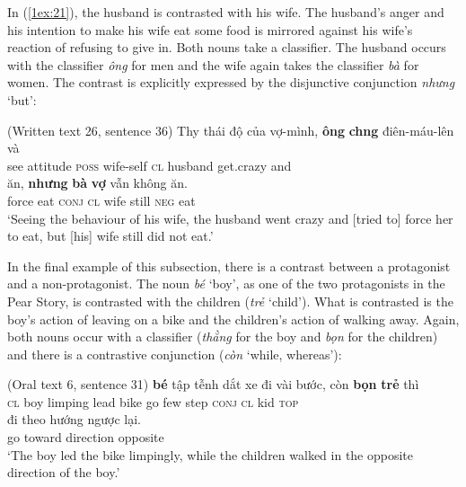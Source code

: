 \documentclass[output=paper]{langsci/langscibook}
\begin{document}
In (\ref{1ex:21}), the husband is contrasted with his wife. The husband's anger and his intention to make his wife eat some food is mirrored against his wife's reaction of refusing to give in. Both nouns take a classifier. The husband occurs with the classifier {\emph{ông}} for men and the wife again takes the classifier {\emph{bà}} for women. The contrast is explicitly expressed by the disjunctive conjunction {\emph{nhưng}} `but':

\begin{exe}
\ex\label{1ex:21}
(Written text 26, sentence 36)
\exi{}
\gll Th{\daa}y  {thái độ}   của       vợ-mình,  {\textbf{ông}} {\textbf{ch{\daob}ng}}     điên-máu-lên  và \\
see     attitude  {\textsc{poss}}   wife-self   {\textsc{cl}}  husband  get.crazy        and \\
\glt 
\exi{}
   ăn,  {\textbf{nhưng}}  {\textbf{bà}}   {\textbf{vợ}}     vẫn  không  ăn.  \\
force    eat   {\textsc{conj}}   {\textsc{cl}}  wife  still  {\textsc{neg}}   eat \\
\glt `Seeing the behaviour of his wife, the husband went crazy and [tried to] force her to eat, but [his] wife still did not eat.'
\end{exe}

In the final example of this subsection, there is a contrast between a protagonist and a non-protagonist. The noun {\emph{bé}} `boy', as one of the two protagonists in the Pear Story, is contrasted with the children ({\emph{trẻ}} `child'). What is contrasted is the boy's action of leaving on a bike and the children's action of walking away. Again, both nouns occur with a classifier ({\emph{thằng}} for the boy and {\emph{bọn}} for the children) and there is a contrastive conjunction ({\emph{còn}} `while, whereas'):

\begin{samepage}
\begin{exe}
\ex\label{1ex:22}
(Oral text 6, sentence 31)
\exi{}
 {\textbf{bé}}    {tập tễnh}  dắt   xe      đi   vài  bước, còn      {\textbf{bọn}} {\textbf{trẻ}}     thì \\
{\textsc{cl}}      boy  limping  lead  bike  go  few  step   {\textsc{conj}}  {\textsc{cl}}  kid   {\textsc{top}} \\
\glt 
\exi{}
\gll đi   theo       hướng       {ngược lại}. \\
go  toward   direction   opposite \\
\glt `The boy led the bike limpingly, while the children walked in the opposite direction of the boy.'
\end{exe}
\end{samepage}
\end{document}

